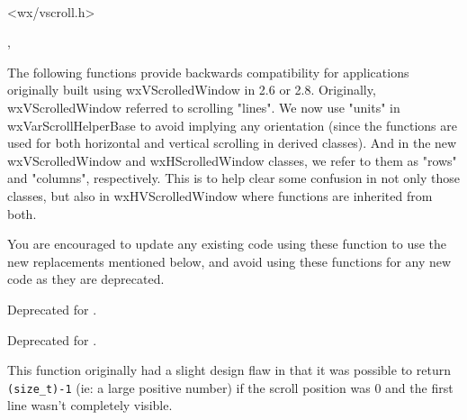 \\


<wx/vscroll.h>


,
\rtfsp{}




\label{wxvscrolledwindowbackwardcompatibility}

The following functions provide backwards compatibility for applications
originally built using wxVScrolledWindow in 2.6 or 2.8. Originally,
wxVScrolledWindow referred to scrolling "lines". We now use "units" in
wxVarScrollHelperBase to avoid implying any orientation (since the functions
are used for both horizontal and vertical scrolling in derived classes). And
in the new wxVScrolledWindow and wxHScrolledWindow classes, we refer to them
as "rows" and "columns", respectively. This is to help clear some confusion
in not only those classes, but also in wxHVScrolledWindow where functions
are inherited from both.

You are encouraged to update any existing code using these function to use
the new replacements mentioned below, and avoid using these functions for
any new code as they are deprecated.


Deprecated for .


Deprecated for .

This function originally had a slight design flaw in that it was possible to
return \texttt{(size\_t)-1} (ie: a large positive number) if the scroll
position was 0 and the first line wasn't completely visible.

